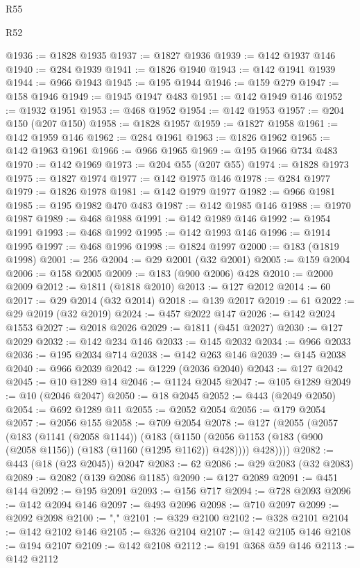 \begin{lexlean}{R55}
\begin{lexlean}{R52}
\begin{coremodule}
{{{{{{{{{{{{{{{{{{{{{{{{{{{{{{{{{{{{{{{{{{{{{{{{{{{{{{{{{{{{{{{{{{{{{{{{{{{{{{{{{{{{{{{{{{{{{{{{{{{{{{{{{{{{{{{{{{{{{{{{{{{{{{{{{{{{{{{{{{{{{{{{{{{{{{{{{{{{{{{{{{{{{{{{{{{{{{{{{{{{{{{{{{{{{{{{{{{{{{@1936 := @1828 @1935
@1937 := @1827 @1936
@1939 := @142 @1937 @146
@1940 := @284 @1939
@1941 := @1826 @1940
@1943 := @142 @1941 @1939
@1944 := @966 @1943
@1945 := @195 @1944
@1946 := @159 @279
@1947 := @158 @1946
@1949 := @1945 @1947 @483
@1951 := @142 @1949 @146
@1952 := @1932 @1951
@1953 := @468 @1952
@1954 := @142 @1953
@1957 := @204 @150 (@207 @150)
@1958 := @1828 @1957
@1959 := @1827 @1958
@1961 := @142 @1959 @146
@1962 := @284 @1961
@1963 := @1826 @1962
@1965 := @142 @1963 @1961
@1966 := @966 @1965
@1969 := @195 @1966 @734 @483
@1970 := @142 @1969
@1973 := @204 @55 (@207 @55)
@1974 := @1828 @1973
@1975 := @1827 @1974
@1977 := @142 @1975 @146
@1978 := @284 @1977
@1979 := @1826 @1978
@1981 := @142 @1979 @1977
@1982 := @966 @1981
@1985 := @195 @1982 @470 @483
@1987 := @142 @1985 @146
@1988 := @1970 @1987
@1989 := @468 @1988
@1991 := @142 @1989 @146
@1992 := @1954 @1991
@1993 := @468 @1992
@1995 := @142 @1993 @146
@1996 := @1914 @1995
@1997 := @468 @1996
@1998 := @1824 @1997
@2000 := @183 (@1819 @1998)
@2001 := 256
@2004 := @29 @2001 (@32 @2001)
@2005 := @159 @2004
@2006 := @158 @2005
@2009 := @183 (@900 @2006) @428
@2010 := @2000 @2009
@2012 := @1811 (@1818 @2010)
@2013 := @127 @2012
@2014 := 60
@2017 := @29 @2014 (@32 @2014)
@2018 := @139 @2017
@2019 := 61
@2022 := @29 @2019 (@32 @2019)
@2024 := @457 @2022 @147
@2026 := @142 @2024 @1553
@2027 := @2018 @2026
@2029 := @1811 (@451 @2027)
@2030 := @127 @2029
@2032 := @142 @234 @146
@2033 := @145 @2032
@2034 := @966 @2033
@2036 := @195 @2034 @714
@2038 := @142 @263 @146
@2039 := @145 @2038
@2040 := @966 @2039
@2042 := @1229 (@2036 @2040)
@2043 := @127 @2042
@2045 := @10 @1289 @14
@2046 := @1124 @2045
@2047 := @105 @1289
@2049 := @10 (@2046 @2047)
@2050 := @18 @2045
@2052 := @443 (@2049 @2050)
@2054 := @692 @1289 @11
@2055 := @2052 @2054
@2056 := @179 @2054
@2057 := @2056 @155
@2058 := @709 @2054
@2078 := @127
    (@2055
      (@2057
        (@183
          (@1141 (@2058 @1144))
          (@183
            (@1150 (@2056 @1153 (@183 (@900 (@2058 @1156)) (@183 (@1160 (@1295 @1162)) @428))))
            @428))))
@2082 := @443 (@18 (@23 @2045)) @2047
@2083 := 62
@2086 := @29 @2083 (@32 @2083)
@2089 := @2082 (@139 @2086 @1185)
@2090 := @127 @2089
@2091 := @451 @144
@2092 := @195 @2091
@2093 := @156 @717
@2094 := @728 @2093
@2096 := @142 @2094 @146
@2097 := @493 @2096
@2098 := @710 @2097
@2099 := @2092 @2098
@2100 := ","
@2101 := @329 @2100
@2102 := @328 @2101
@2104 := @142 @2102 @146
@2105 := @326 @2104
@2107 := @142 @2105 @146
@2108 := @194 @2107
@2109 := @142 @2108
@2112 := @191 @368 @59 @146
@2113 := @142 @2112
}}}}}}}}}}}}}}}}}}}}}}}}}}}}}}}}}}}}}}}}}}}}}}}}}}}}}}}}}}}}}}}}}}}}}}}}}}}}}}}}}}}}}}}}}}}}}}}}}}}}}}}}}}}}}}}}}}}}}}}}}}}}}}}}}}}}}}}}}}}}}}}}}}}}}}}}}}}}}}}}}}}}}}}}}}}}}}}}}}}}}}}}}}}}}}}}}}}}}}
\end{coremodule}
\end{lexlean}
\end{lexlean}
